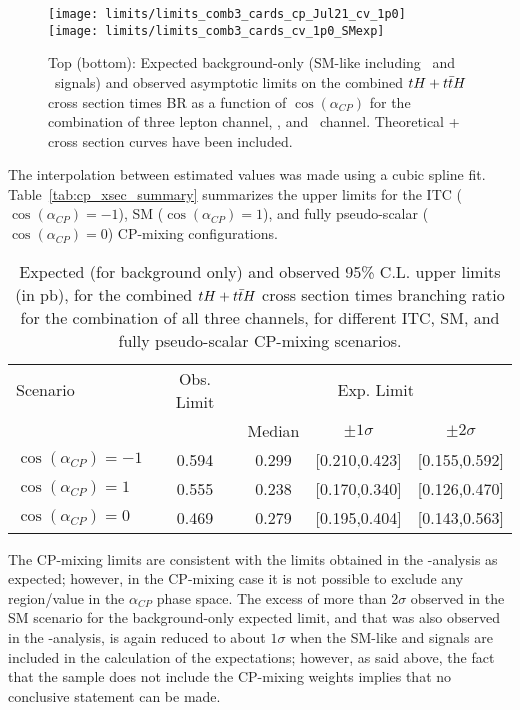 \begin{figure} [!b]
      \centering
      \texttt{[image: limits/limits\_comb3\_cards\_cp\_Jul21\_cv\_1p0]}\\
      \texttt{[image: limits/limits\_comb3\_cards\_cv\_1p0\_SMexp]}
      \caption[Asymptotic limits on the combined $\tH+\ttH$ $\sigma\times$BR for CP-mixing angle.]{Top (bottom): Expected background-only (SM-like including  \ttH\ and \tH\ signals) and observed asymptotic limits on the combined $\tH+\ttH$ cross section times BR as a function of $\cos (\alpha_{CP})$ for the combination of three lepton channel, \mumu, and \emu\ channel. Theoretical \tH + \ttH cross section curves have been included.}
\label{fig:cp_limits}
\end{figure}

The interpolation between estimated values was made using a cubic spline fit. Table~\ref{tab:cp_xsec_summary} summarizes the upper limits for the ITC ($\cos (\alpha_{CP})=-1$), SM ($\cos (\alpha_{CP})=1$), and fully pseudo-scalar ($\cos (\alpha_{CP})=0$) CP-mixing configurations.

\begin{table}[h!]
\centering
\small
\begin{tabular}{lcccc}\hline
Scenario               &  Obs. Limit & \multicolumn{3}{c}{Exp. Limit}           \\
                       &             & Median  & $\pm 1\sigma$ & $\pm 2\sigma$  \\ \hline
$\cos (\alpha_{CP})=-1$& 0.594       & 0.299   & [0.210,0.423] & [0.155,0.592]  \\
$\cos (\alpha_{CP})=1$ & 0.555       & 0.238   & [0.170,0.340] & [0.126,0.470]  \\  
$\cos (\alpha_{CP})=0$ & 0.469       & 0.279   & [0.195,0.404] & [0.143,0.563]  \\\hline   
\end{tabular}
 \caption[Summary of expected and observed upper limits for CP-mixing angles.]{Expected (for background only) and observed 95\% C.L. upper limits (in pb), for the combined $\tH+\ttH$ cross section times branching ratio for the combination of all three channels, for different ITC, SM, and fully pseudo-scalar CP-mixing scenarios.}\label{tab:cp_xsec_summary}
\label{tab:limits}
\end{table}

The CP-mixing limits are consistent with the limits obtained in the \Ct-\CV analysis as expected; however, in the CP-mixing case it is not possible to exclude any region/value in the $\alpha_{CP}$ phase space. The excess of more than 2$\sigma$ observed in the SM scenario for the background-only expected limit, and that was also observed in the \Ct-\CV analysis, is again reduced to about $1\sigma$ when the SM-like \tH and \ttH signals are included in the calculation of the expectations; however, as said above, the fact that the \ttH sample does not include the CP-mixing weights implies that no conclusive statement can be made.

